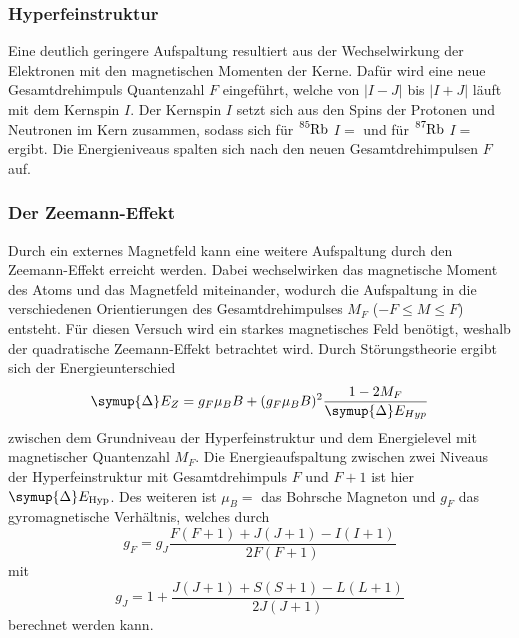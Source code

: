 \subsubsection{Hyperfeinstruktur}
Eine deutlich geringere Aufspaltung resultiert aus der Wechselwirkung der Elektronen mit den magnetischen Momenten der Kerne.
Dafür wird eine neue Gesamtdrehimpuls Quantenzahl $F$ eingeführt, welche von $|I - J|$ bis $|I + J|$ läuft mit dem Kernspin $I$.
Der Kernspin $I$ setzt sich aus den Spins der Protonen und Neutronen im Kern zusammen, sodass sich für $\ce{^{85}Rb}$ $I = $  und für $\ce{^{87}Rb}$
$I = $ ergibt. Die Energieniveaus spalten sich nach den neuen Gesamtdrehimpulsen $F$ auf. 

\subsubsection{Der Zeemann-Effekt}
Durch ein externes Magnetfeld kann eine weitere Aufspaltung durch den Zeemann-Effekt erreicht werden.
Dabei wechselwirken das magnetische Moment des Atoms und das Magnetfeld miteinander, wodurch die Aufspaltung in die
verschiedenen Orientierungen des Gesamtdrehimpulses $M_F$ ($-F \leq M \leq F$) entsteht. Für diesen Versuch wird ein starkes magnetisches Feld benötigt,
weshalb der quadratische Zeemann-Effekt betrachtet wird.
Durch Störungstheorie ergibt sich der Energieunterschied
\begin{equation}
    \symup{\Delta} E_Z = g_F \mu_B B + (g_F \mu_B B)^2 \frac{1-2M_F}{\symup{\Delta} E_{Hyp}}
    \label{eqn:zeem}
\end{equation}
zwischen dem Grundniveau der Hyperfeinstruktur und dem Energielevel mit magnetischer Quantenzahl $M_F$. 
Die Energieaufspaltung zwischen zwei Niveaus der Hyperfeinstruktur mit Gesamtdrehimpuls $F$ und $F+1$ ist hier $\symup{\Delta} E_{\text{Hyp}}$.
Des weiteren ist $\mu_B = $ das Bohrsche Magneton und $g_F$ das gyromagnetische Verhältnis, welches durch
\begin{equation}
    g_F = g_J \frac{F(F+1)+J(J+1)-I(I+1)}{2F(F+1)}
    \label{eqn:aa}
\end{equation}
mit
\begin{equation}
    g_J = 1 + \frac{J(J+1)+S(S+1)-L(L+1)}{2J(J+1)}
    \label{eqn:bb}
\end{equation}
berechnet werden kann.\cite{dem}

